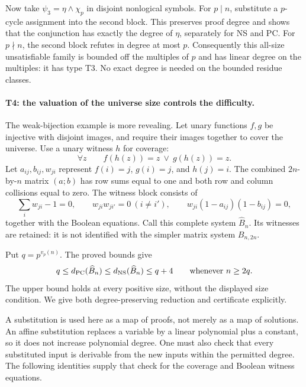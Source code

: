 Now take $\psi_3=\eta\wedge\chi_p$ in disjoint nonlogical symbols.
For $p\mid n$, substitute a $p$-cycle assignment into the second block.
This preserves proof degree and shows that the conjunction has exactly the
degree of $\eta$, separately for NS and PC. For $p\nmid n$, the second
block refutes in degree at most $p$. Consequently this all-size
unsatisfiable family is bounded off the multiples of $p$ and has linear
degree on the multiples: it has type T3. No exact degree is needed on the
bounded residue classes.

\paragraph{T4: the valuation of the universe size controls the difficulty.}
The weak-bijection example is more revealing. Let unary functions $f,g$
be injective with disjoint images, and require their images together to
cover the universe. Use a unary witness $h$ for coverage:
\[
 \forall z\qquad f(h(z))=z\ \vee\ g(h(z))=z.
\]
Let $a_{ij},b_{ij},w_{ji}$ represent $f(i)=j$, $g(i)=j$, and $h(j)=i$.
The combined $2n$-by-$n$ matrix $(a;b)$ has row sums equal to one and both
row and column collisions equal to zero. The witness block consists of
\begin{equation}\label{tx:eq:bhat-witness}
 \sum_iw_{ji}-1=0,\qquad
 w_{ji}w_{ji'}=0\ (i\ne i'),\qquad
 w_{ji}(1-a_{ij})(1-b_{ij})=0,
\end{equation}
together with the Boolean equations. Call this complete system
$\widehat B_n$. Its witnesses are retained: it is not identified with the
simpler matrix system $B_{n,2n}$.

Put $q=p^{v_p(n)}$. The proved bounds give
\begin{equation}\label{tx:eq:bhat-window}
 q\leq d_{\mathrm{PC}}(\widehat B_n)
 \leq d_{\mathrm{NS}}(\widehat B_n)\leq q+4
 \qquad\hbox{whenever } n\geq2q.
\end{equation}
The upper bound holds at every positive size, without the displayed size
condition. We give both degree-preserving reduction and certificate
explicitly.

A substitution is used here as a map of proofs, not merely as a map
of solutions. An affine substitution replaces a variable by a linear
polynomial plus a constant, so it does not increase polynomial degree.
One must also check that every substituted input is derivable from the
new inputs within the permitted degree. The following identities supply
that check for the coverage and Boolean witness equations.

